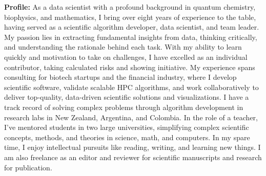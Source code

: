 
\vspace*{-5mm}
\begin{tcolorbox}[
        width=\textwidth,
        colback={gray!30},
        colframe=white,
        sharp corners,
        boxrule=0mm,
        arc=1mm,
    ]
    \begin{spacing}{1.2}
        \begin{multicols}{2}
            {\bf\large Profile:}
            As a data scientist with a profound background in quantum chemistry, biophysics, and mathematics, I bring over eight years of experience to the table, having served as a scientific algorithm developer, data scientist, and team leader. My passion lies in extracting fundamental insights from data, thinking critically, and understanding the rationale behind each task. With my ability to learn quickly and motivation to take on challenges, I have excelled as an individual contributor, taking calculated risks and showing initiative. My experience spans consulting for biotech startups and the financial industry, where I develop scientific software, validate scalable HPC algorithms, and work collaboratively to deliver top-quality, data-driven scientific solutions and visualizations. I have a track record of solving complex problems through algorithm development in research labs in New Zealand, Argentina, and Colombia. In the role of a teacher, I've mentored students in two large universities, simplifying complex scientific concepts, methods, and theories in science, math, and computers. In my spare time, I enjoy intellectual pursuits like reading, writing, and learning new things. I am also freelance as an editor and reviewer for scientific manuscripts and research for publication.

        \end{multicols}
    \end{spacing}
    \vspace*{-4mm}
\end{tcolorbox}
